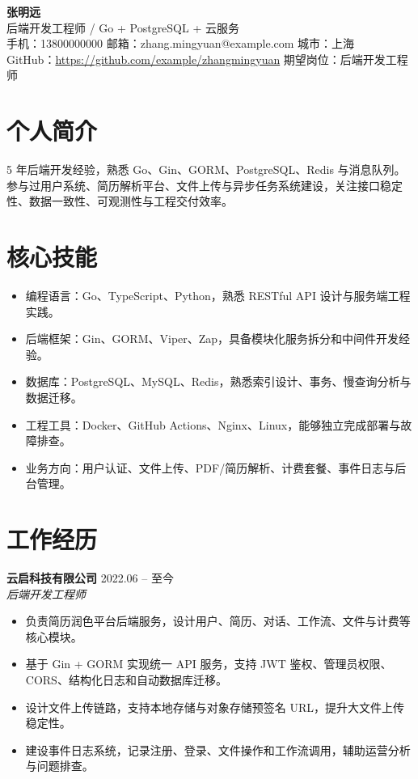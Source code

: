 \documentclass[11pt,a4paper]{article}
\begin{document}
{\Huge\bfseries 张明远}\\[0.25em]
{\large 后端开发工程师 / Go + PostgreSQL + 云服务}\\[0.45em]
手机：13800000000 \quad 邮箱：zhang.mingyuan@example.com \quad 城市：上海\\
GitHub：\url{https://github.com/example/zhangmingyuan} \quad 期望岗位：后端开发工程师

\section{个人简介}
5 年后端开发经验，熟悉 Go、Gin、GORM、PostgreSQL、Redis 与消息队列。参与过用户系统、简历解析平台、文件上传与异步任务系统建设，关注接口稳定性、数据一致性、可观测性与工程交付效率。

\section{核心技能}
\begin{itemize}
  \item 编程语言：Go、TypeScript、Python，熟悉 RESTful API 设计与服务端工程实践。
  \item 后端框架：Gin、GORM、Viper、Zap，具备模块化服务拆分和中间件开发经验。
  \item 数据库：PostgreSQL、MySQL、Redis，熟悉索引设计、事务、慢查询分析与数据迁移。
  \item 工程工具：Docker、GitHub Actions、Nginx、Linux，能够独立完成部署与故障排查。
  \item 业务方向：用户认证、文件上传、PDF/简历解析、计费套餐、事件日志与后台管理。
\end{itemize}

\section{工作经历}
\textbf{云启科技有限公司} \hfill 2022.06 -- 至今\\
\textit{后端开发工程师}
\begin{itemize}
  \item 负责简历润色平台后端服务，设计用户、简历、对话、工作流、文件与计费等核心模块。
  \item 基于 Gin + GORM 实现统一 API 服务，支持 JWT 鉴权、管理员权限、CORS、结构化日志和自动数据库迁移。
  \item 设计文件上传链路，支持本地存储与对象存储预签名 URL，提升大文件上传稳定性。
  \item 建设事件日志系统，记录注册、登录、文件操作和工作流调用，辅助运营分析与问题排查。
\end{itemize}
\end{document}
